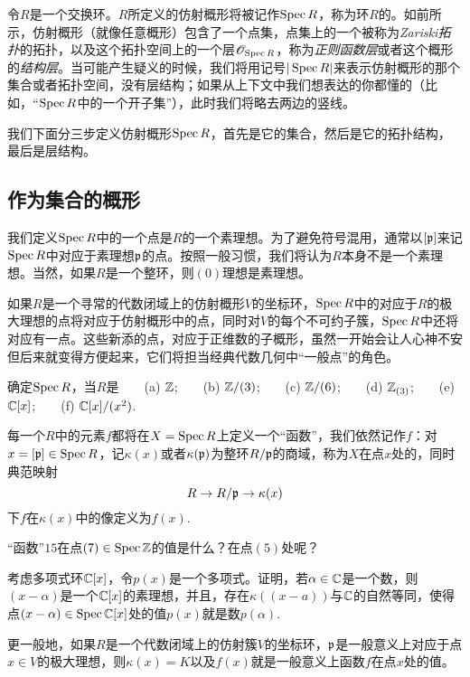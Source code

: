 令$R$是一个交换环。$R$所定义的仿射概形将被记作$\operatorname{Spec} R$，称为环$R$的。如前所示，仿射概形（就像任意概形）包含了一个点集，点集上的一个被称为\textit{Zariski拓扑}的拓扑，以及这个拓扑空间上的一个层$\mathscr{O}_{\operatorname{Spec} R}$，称为\textit{正则函数层}或者这个概形的\textit{结构层}。当可能产生疑义的时候，我们将用记号$|\operatorname{Spec} R|$来表示仿射概形的那个集合或者拓扑空间，没有层结构；如果从上下文中我们想表达的你都懂的（比如，“$\operatorname{Spec} R$中的一个开子集”），此时我们将略去两边的竖线。

我们下面分三步定义仿射概形$\operatorname{Spec} R$，首先是它的集合，然后是它的拓扑结构，最后是层结构。

\subsection{作为集合的概形}\label{s:1.1.1}

我们定义$\operatorname{Spec} R$中的一个点是$R$的一个素理想。为了避免符号混用，通常以$[\mathfrak{p}]$来记$\operatorname{Spec} R$中对应于素理想$\mathfrak{p}$的点。按照一般习惯，我们将认为$R$本身不是一个素理想。当然，如果$R$是一个整环，则$(0)$理想是素理想。

如果$R$是一个寻常的代数闭域上的仿射概形$V$的坐标环，$\operatorname{Spec} R$中的对应于$R$的极大理想的点将对应于仿射概形中的点，同时对$V$的每个不可约子簇，$\operatorname{Spec} R$中还将对应有一点。这些新添的点，对应于正维数的子概形，虽然一开始会让人心神不安但后来就变得方便起来，它们将担当经典代数几何中“一般点”的角色。

\begin{exe}
确定$\operatorname{Spec} R$，当$R$是~~~~(a) $\mathbb{Z}$;~~~~(b) $\mathbb{Z}/(3)$;~~~~(c) $\mathbb{Z}/(6)$;~~~~(d) $\mathbb{Z}_{(3)}$;~~~~(e) $\mathbb{C}[x]$;~~~~(f) $\mathbb{C}[x]/(x^2)$.
\end{exe}

每一个$R$中的元素$f$都将在$X=\operatorname{Spec} R$上定义一个“函数”，我们依然记作$f$：对$x=[\mathfrak{p}]\in \operatorname{Spec} R$，记$\kappa(x)$或者$\kappa(\mathfrak{p})$为整环$R/\mathfrak{p}$的商域，称为$X$在点$x$处的，同时典范映射
\[
	R\to R/\mathfrak{p}\to \kappa(x)
\]
下$f$在$\kappa(x)$中的像定义为$f(x)$.

\begin{exe}
	“函数”$15$在点$(7)\in \operatorname{Spec} \mathbb{Z}$的值是什么？在点$(5)$处呢？
\end{exe}

\begin{exe}
	\begin{compactenum}[{(a)}]
		\item 考虑多项式环$\mathbb{C}[x]$，令$p(x)$是一个多项式。证明，若$\alpha\in\mathbb{C}$是一个数，则$(x-\alpha)$是一个$\mathbb{C}[x]$的素理想，并且，存在$\kappa((x-a))$与$\mathbb{C}$的自然等同，使得点$(x-\alpha)\in\operatorname{Spec}\mathbb{C}[x]$处的值$p(x)$就是数$p(\alpha)$.
		\item 更一般地，如果$R$是一个代数闭域上的仿射簇$V$的坐标环，$\mathfrak{p}$是一般意义上对应于点$x\in V$的极大理想，则$\kappa(x)=K$以及$f(x)$就是一般意义上函数$f$在点$x$处的值。
	\end{compactenum}
\end{exe}

